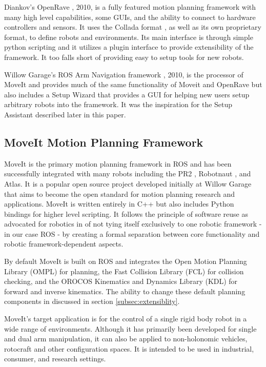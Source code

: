 \documentclass[10pt,journal,compsoc]{joser1}
\begin{document}
{Diankov's OpenRave  \cite{}, 2010, is a fully featured motion planning framework with many high level capabilities, some GUIs, and the ability to connect to hardware controllers and sensors. It uses the Collada format \cite{collada}, as well as its own proprietary format, to define robots and environments. Its main interface is through simple python scripting and it utilizes a plugin interface to provide extensibility of the framework. It too falls short of providing easy to setup tools for new robots. 

Willow Garage's ROS Arm Navigation framework \cite{}, 2010, is the processor of MoveIt and provides much of the same functionality of Moveit and OpenRave but also includes a Setup Wizard that provides a GUI for helping new users setup arbitrary robots into the framework. It was the inspiration for the Setup Assistant described later in this paper.

\subsection{MoveIt Motion Planning Framework}
\label{sec::moveit}

MoveIt is the primary motion planning framework in ROS and has been successfully integrated with many robots including the PR2 \cite{wyrobek2008towards}, Robotnaut \cite{ambrose2000robonaut}, and Atlas. It is a popular open source project developed initially at Willow Garage that aims to become the open standard for motion planning research and applications. MoveIt is written entirely in C++ but also includes Python bindings for higher level scripting. It follows the principle of software reuse as advocated for robotics in \cite{makarenko2007benefits} of not tying itself exclusively to one robotic framework - in our case ROS - by creating a formal separation between core functionality and robotic framework-dependent aspects. 

By default MoveIt is built on ROS and integrates the Open Motion Planning Library (OMPL) \cite{sucan2012the-open-motion-planning-library} for planning, the Fast Collision Library (FCL) \cite{fcl} for collision checking, and the OROCOS Kinematics and Dynamics Library (KDL) \cite{kdl} for forward and inverse kinematics. The ability to change these default planning components in discussed in section \ref{subsec:extensiblity}.

MoveIt's target application is for the control of a single rigid body robot in a wide range of environments. Although it has primarily been developed for single and dual arm manipulation, it can also be applied to non-holonomic vehicles, rotocraft and other configuration spaces. It is intended to be used in industrial, consumer, and research settings. 

}
\end{document}
